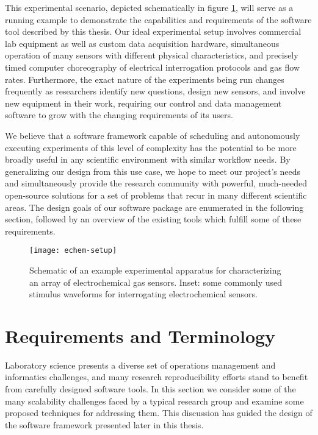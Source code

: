 \documentclass[../thesis]{subfiles}
\begin{document}
This experimental scenario, depicted schematically in figure
\ref{fig:EchemSetup},
will serve as a running example to demonstrate the
capabilities and requirements of the software tool described by this
thesis. Our ideal experimental setup involves commercial lab equipment
as well as custom data acquisition hardware, simultaneous operation of
many sensors with different physical characteristics, and precisely
timed computer choreography of electrical interrogation protocols and
gas flow rates. Furthermore, the exact nature of the experiments being
run changes frequently as researchers identify new questions, design
new sensors, and involve new equipment in their work,
requiring our control and data management software to grow with the
changing requirements of its users.

We believe that a software framework capable of scheduling and
autonomously executing experiments of this level of complexity has the
potential to be more broadly useful in any scientific environment with
similar workflow needs. By generalizing our design from this use case,
we hope to meet our project's needs and simultaneously provide the
research community with powerful, much-needed open-source solutions
for a set of problems that recur in many different scientific areas.
The design goals of our software package are enumerated in the
following section, followed by an overview of the existing tools which
fulfill some of these requirements.

\begin{figure}
  \texttt{[image: echem-setup]}
  \caption{
    Schematic of an example experimental apparatus for
    characterizing an array of electrochemical gas sensors.
    Inset: some commonly used stimulus waveforms for interrogating
    electrochemical sensors.
    \label{fig:EchemSetup}
  }
\end{figure}



\section{Requirements and Terminology}
Laboratory science presents a diverse set of operations management and
informatics challenges, and many research reproducibility efforts stand to
benefit from carefully designed software tools. In this section we
consider some of the many scalability challenges faced by a typical
research group and examine some proposed techniques for addressing
them. This discussion has guided the design of the software framework
presented later in this thesis.
\end{document}
